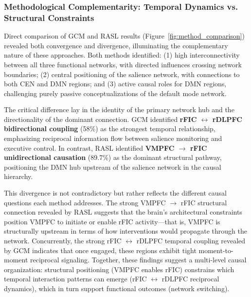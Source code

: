 \subsubsection{Methodological Complementarity: Temporal Dynamics vs. Structural Constraints}

Direct comparison of GCM and RASL results (Figure~\ref{fig:method_comparison}) revealed both convergence and divergence, illuminating the complementary nature of these approaches. Both methods identified: (1) high interconnectivity between all three functional networks, with directed influences crossing network boundaries; (2) central positioning of the salience network, with connections to both CEN and DMN regions; and (3) active causal roles for DMN regions, challenging purely passive conceptualizations of the default mode network.

The critical difference lay in the identity of the primary network hub and the directionality of the dominant connection. GCM identified \textbf{rFIC $\leftrightarrow$ rDLPFC bidirectional coupling} (58\%) as the strongest temporal relationship, emphasizing reciprocal information flow between salience monitoring and executive control. In contrast, RASL identified \textbf{VMPFC $\rightarrow$ rFIC unidirectional causation} (89.7\%) as the dominant structural pathway, positioning the DMN hub upstream of the salience network in the causal hierarchy.

This divergence is not contradictory but rather reflects the different causal questions each method addresses. The strong VMPFC $\rightarrow$ rFIC structural connection revealed by RASL suggests that the brain's architectural constraints position VMPFC to initiate or enable rFIC activity—that is, VMPFC is structurally upstream in terms of how interventions would propagate through the network. Concurrently, the strong rFIC $\leftrightarrow$ rDLPFC temporal coupling revealed by GCM indicates that once engaged, these regions exhibit tight moment-to-moment reciprocal signaling. Together, these findings suggest a multi-level causal organization: structural positioning (VMPFC enables rFIC) constrains which temporal interaction patterns can emerge (rFIC $\leftrightarrow$ rDLPFC reciprocal dynamics), which in turn support functional outcomes (network switching).

